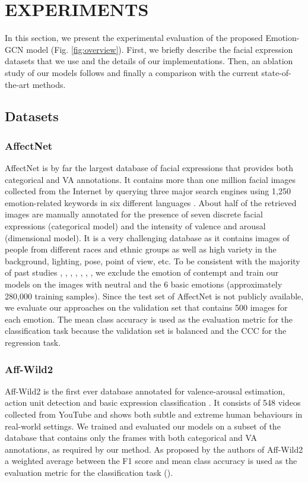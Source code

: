 \documentclass[a4paper, 10pt, conference]{ieeeconf}      \usepackage{FG2021}
\begin{document}
\section{EXPERIMENTS}
\label{sec:experiments}

In this section, we present the experimental evaluation of the proposed Emotion-GCN model (Fig. \ref{fig:overview}). First, we briefly describe the facial expression datasets that we use and the details of our implementations. Then, an ablation study of our models follows and finally a comparison with the current state-of-the-art methods.

\subsection{Datasets}

\subsubsection{AffectNet} AffectNet is by far the largest database of facial expressions that provides both categorical and VA annotations. It contains more than one million facial images collected from the Internet by querying three major search engines using 1,250 emotion-related keywords in six different languages \cite{mollahosseini2017affectnet}. About half of the retrieved images are manually annotated for the presence of seven discrete facial expressions (categorical model) and the intensity of valence and arousal (dimensional model). It is a very challenging database as it contains images of people from different races and ethnic groups as well as high variety in the background, lighting, pose, point of view, etc. To be consistent with the majority of past studies \cite{zeng2018facial}, \cite{li2018occlusion}, \cite{chen2019facial}, \cite{kervadec2018cake}, \cite{ding2020occlusion}, \cite{georgescu2019local}, \cite{hayale2019facial}, we exclude the emotion of contempt and train our models on the images with neutral and the 6 basic emotions (approximately 280,000 training samples). Since the test set of AffectNet is not publicly available, we evaluate our approaches on the validation set that contains 500 images for each emotion. The mean class accuracy is used as the evaluation metric for the classification task because the validation set is balanced and the CCC for the regression task.

\subsubsection{Aff-Wild2} Aff-Wild2 is the first ever database annotated for valence-arousal estimation, action unit detection and basic expression classification \cite{kollias2019expression}. It consists of 548 videos collected from YouTube and shows both subtle and extreme human behaviours in real-world settings. We trained and evaluated our models on a subset of the database that contains only the frames with both categorical and VA annotations, as required by our method. As proposed by the authors of Aff-Wild2 a weighted average between the F1 score and mean class accuracy is used as the evaluation metric for the classification task ().
\end{document}
